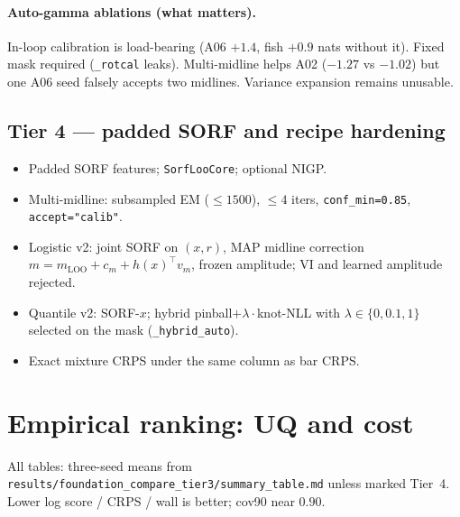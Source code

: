 \documentclass[11pt,a4paper]{article}
\theoremstyle{definition}
\begin{document}
\paragraph{Auto-gamma ablations (what matters).}
In-loop calibration is load-bearing (A06 $+1.4$, fish $+0.9$ nats without it).
Fixed mask required (\texttt{\_rotcal} leaks). Multi-midline helps A02
($-1.27$ vs $-1.02$) but one A06 seed falsely accepts two midlines.
Variance expansion remains unusable.

\subsection{Tier 4 --- padded SORF and recipe hardening}
\begin{itemize}[leftmargin=1.4em,itemsep=0.15em]
  \item Padded SORF features; \texttt{SorfLooCore}; optional NIGP.
  \item Multi-midline: subsampled EM ($\le 1500$), $\le 4$ iters,
        \texttt{conf\_min=0.85}, \texttt{accept="calib"}.
  \item Logistic v2: joint SORF on $(x,r)$, MAP midline correction
        $m=m_{\mathrm{LOO}}+c_m+h(x)^\top v_m$, frozen amplitude;
        VI and learned amplitude rejected.
  \item Quantile v2: SORF-$x$; hybrid pinball$+\lambda\cdot$knot-NLL with
        $\lambda\in\{0,0.1,1\}$ selected on the mask (\texttt{\_hybrid\_auto}).
  \item Exact mixture CRPS under the same column as bar CRPS.
\end{itemize}

\section{Empirical ranking: UQ and cost}
\label{sec:results}

All tables: three-seed means from
\texttt{results/foundation\_compare\_tier3/summary\_table.md}
unless marked Tier~4. Lower log score / CRPS / wall is better; cov90 near $0.90$.
\end{document}
